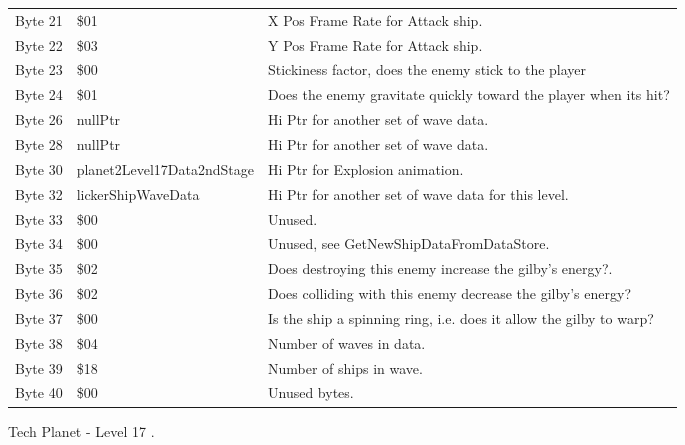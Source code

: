 \begin{figure}[H]
{\begin{adjustbox}{width=12cm}
\begin{tabular}{lll}
 Byte 21 & \$01                        & X Pos Frame Rate for Attack ship.                                  \\
 Byte 22 & \$03                        & Y Pos Frame Rate for Attack ship.                                  \\
 Byte 23 & \$00                        & Stickiness factor, does the enemy stick to the player              \\
 Byte 24 & \$01                        & Does the enemy gravitate quickly toward the player when its hit?   \\
 Byte 26 & nullPtr                    & Hi Ptr for another set of wave data.                               \\
 Byte 28 & nullPtr                    & Hi Ptr for another set of wave data.                               \\
 Byte 30 & planet2Level17Data2ndStage & Hi Ptr for Explosion animation.                                    \\
 Byte 32 & lickerShipWaveData         & Hi Ptr for another set of wave data for this level.                \\
 Byte 33 & \$00                        & Unused.                                                            \\
 Byte 34 & \$00                        & Unused, see GetNewShipDataFromDataStore.                           \\
 Byte 35 & \$02                        & Does destroying this enemy increase the gilby's energy?.           \\
 Byte 36 & \$02                        & Does colliding with this enemy decrease the gilby's energy?        \\
 Byte 37 & \$00                        & Is the ship a spinning ring, i.e. does it allow the gilby to warp? \\
 Byte 38 & \$04                        & Number of waves in data.                                           \\
 Byte 39 & \$18                        & Number of ships in wave.                                           \\
 Byte 40 & \$00                        & Unused bytes.                                                      \\
\bottomrule
\end{tabular}

  \end{adjustbox}

  }\caption*{Tech Planet - Level 17
.}
\end{figure}

